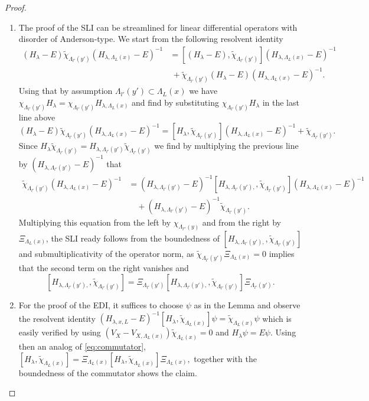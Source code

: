 \documentclass[10pt,a4paper]{amsart}
\begin{document}
\begin{proof}
\begin{enumerate}
\item The proof of the SLI can be streamlined for linear differential operators with disorder of Anderson-type. We start from the following resolvent identity
\[ \begin{split}
(H_{\lambda}-E)\tilde \chi_{\Lambda_{l'}(y')}(H_{\lambda,\Lambda_L(x)}-E)^{-1} &= [ (H_{\lambda}-E),\tilde \chi_{\Lambda_{l'}(y')}](H_{\lambda,\Lambda_L(x)}-E)^{-1} \\
&\ + \tilde\chi_{\Lambda_{l'}(y')} (H_{\lambda}-E) (H_{\lambda,\Lambda_L(x)}-E)^{-1}.
\end{split}\]
Using that by assumption $\Lambda_{l'}(y') \subset \Lambda_{L}(x)$ we have $\chi_{\Lambda_{l'}(y')}H_{\lambda} = \chi_{\Lambda_{l'}(y')}H_{\lambda,\Lambda_L(x)}$ and find by substituting $\chi_{\Lambda_{l'}(y')}H_{\lambda} $ in the last line above 
\[ (H_{\lambda}-E)\tilde \chi_{\Lambda_{l'}(y')}(H_{\lambda,\Lambda_L(x)}-E)^{-1} = [ H_{\lambda},\tilde \chi_{\Lambda_{l'}(y')}](H_{\lambda,\Lambda_L(x)}-E)^{-1} + \tilde \chi_{\Lambda_{l'}(y')}.\]
Since $H_{\lambda}  \tilde\chi_{\Lambda_{l'}(y')} = H_{\lambda,\Lambda_{l'}(y')} \tilde\chi_{\Lambda_{l'}(y')}$ we find by multiplying the previous line by $(H_{\lambda,\Lambda_{l'}(y')}-E)^{-1}$ that 
\[ \begin{split} \tilde \chi_{\Lambda_{l'}(y')}(H_{\lambda,\Lambda_L(x)}-E)^{-1} &= (H_{\lambda,\Lambda_{l'}(y')}-E)^{-1}[ H_{\lambda,\Lambda_{l'}(y'),},\tilde \chi_{\Lambda_{l'}(y')}](H_{\lambda,\Lambda_L(x)}-E)^{-1} \\
&\quad + (H_{\lambda,\Lambda_{l'}(y')}-E)^{-1}\tilde\chi_{\Lambda_{l'}(y')}.
\end{split}\] 
Multiplying this equation from the left by $\chi_{\Lambda_{l''}(y)}$ and from the right by $\Xi_{\Lambda_L(x)}$, the SLI ready follows from the boundedness of $[ H_{\lambda,\Lambda_{l'}(y'),},\tilde \chi_{\Lambda_{l'}(y')}]$ and submultiplicativity of the operator norm, as $\tilde \chi_{\Lambda_{l'}(y')} \Xi_{\Lambda_L(x)}=0$ implies that the second term on the right vanishes and 
\begin{equation}
\label{eq:commutator}
[ H_{\lambda,\Lambda_{l'}(y'),},\tilde \chi_{\Lambda_{l'}(y')}] = \Xi_{\Lambda_{l'}(y')}[ H_{\lambda,\Lambda_{l'}(y'),},\tilde \chi_{\Lambda_{l'}(y')}] \Xi_{\Lambda_{l'}(y')}.
\end{equation}

\item For the proof of the EDI, it suffices to choose $\psi$ as in the Lemma and observe the resolvent identity $(H_{\lambda, x, L}-E)^{-1}[H_{\lambda}, \tilde \chi_{\Lambda_L(x)} ]\psi=\tilde \chi_{\Lambda_L(x)} \psi$ which is easily verified by using $(V_X-V_{X,\Lambda_L(x)}) \tilde \chi_{\Lambda_L(x)}=0$ and $H_{\lambda} \psi = E \psi.$
Using then an analog of \eqref{eq:commutator}, $[H_{\lambda}, \tilde \chi_{\Lambda_L(x)} ]= \Xi_{\Lambda_L(x)}[H_{\lambda}, \tilde \chi_{\Lambda_L(x)} ]\Xi_{\Lambda_L(x)},$ together with the boundedness of the commutator shows the claim.
\end{enumerate}
\end{proof}
\end{document}
